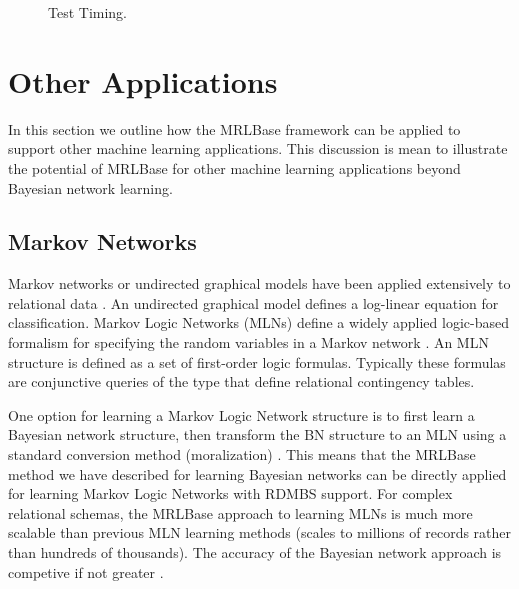 \documentclass{acm_proc_article-sp}
\begin{document}
\begin{figure}[htbp] %
 \centering
{} 
\caption{Test Timing.   
}
 \label{fig:test-timing}
\end{figure}

\section{Other Applications}

In this section we outline how the MRLBase framework can be applied to support other machine learning applications. This discussion is mean to illustrate the potential of MRLBase for other machine learning applications beyond Bayesian network learning.

\subsection{Markov Networks} Markov networks or undirected graphical models have been applied extensively to relational data \cite{taskar,domingos}. An  undirected graphical model defines a log-linear equation for classification. Markov Logic Networks (MLNs) define a widely applied logic-based formalism for specifying the random variables in a Markov network \cite{domingos}. An MLN structure is defined as a set of first-order logic formulas. Typically these formulas are conjunctive queries of the type that define relational contingency tables. 

One option for learning a Markov Logic Network structure is to first learn a Bayesian network structure, then transform the BN structure to an MLN using a standard conversion method (moralization) \cite{MLJ}. This means that the MRLBase method we have described for learning Bayesian networks can be directly applied for learning Markov Logic Networks with RDMBS support. For complex relational schemas, the MRLBase approach to learning MLNs is much more scalable than previous MLN learning methods (scales to millions of records rather than hundreds of thousands). The accuracy of the Bayesian network approach is competive if not greater \cite{}.
\end{document}
